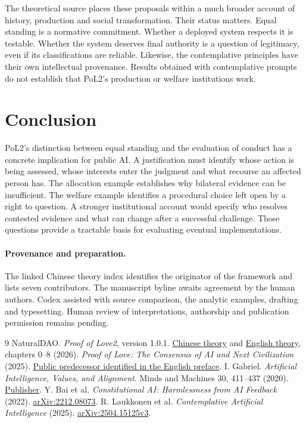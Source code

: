 \documentclass[11pt]{article}
\begin{document}
The theoretical source places these proposals within a much broader account of history, production and social transformation. Their status matters. Equal standing is a normative commitment. Whether a deployed system respects it is testable. Whether the system deserves final authority is a question of legitimacy, even if its classifications are reliable. Likewise, the contemplative principles have their own intellectual provenance. Results obtained with contemplative prompts do not establish that PoL2's production or welfare institutions work.

\section{Conclusion}
PoL2's distinction between equal standing and the evaluation of conduct has a concrete implication for public AI. A justification must identify whose action is being assessed, whose interests enter the judgment and what recourse an affected person has. The allocation example establishes why bilateral evidence can be insufficient. The welfare example identifies a procedural choice left open by a right to question. A stronger institutional account would specify who resolves contested evidence and what can change after a successful challenge. Those questions provide a tractable basis for evaluating eventual implementations.

\paragraph{Provenance and preparation.} The linked Chinese theory index identifies the originator of the framework and lists seven contributors. The manuscript byline awaits agreement by the human authors. Codex assisted with source comparison, the analytic examples, drafting and typesetting. Human review of interpretations, authorship and publication permission remains pending.

\begin{thebibliography}{9}
 NaturalDAO. \emph{Proof of Love2}, version 1.0.1. \href{https://github.com/naturaldao/NaturalDAO/tree/2cedb9eb448e731a114efffabf0d22836c4260af/PoL}{Chinese theory} and \href{https://github.com/naturaldao/NaturalDAO/tree/2cedb9eb448e731a114efffabf0d22836c4260af/PoLEn}{English theory}, chapters 0--8 (2026).
 \emph{Proof of Love: The Consensus of AI and Next Civilization} (2025). \href{https://www.researchgate.net/publication/396699934_Proof_of_Love_The_Consensus_of_AI_and_Next_Civilization}{Public predecessor identified in the English preface}.
 I. Gabriel. \emph{Artificial Intelligence, Values, and Alignment}. Minds and Machines 30, 411--437 (2020). \href{https://doi.org/10.1007/s11023-020-09539-2}{Publisher}.
 Y. Bai et al. \emph{Constitutional AI: Harmlessness from AI Feedback} (2022). \href{https://arxiv.org/abs/2212.08073}{arXiv:2212.08073}.
 R. Laukkonen et al. \emph{Contemplative Artificial Intelligence} (2025). \href{https://arxiv.org/abs/2504.15125v3}{arXiv:2504.15125v3}.
\end{thebibliography}
\end{document}
